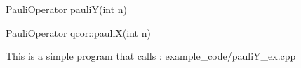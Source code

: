 
\begin{apidefinition}

\begin{Csynopsis}
    PauliOperator pauliY(int n)
\end{Csynopsis}

\begin{Cppsynopsis}
    PauliOperator qcor::pauliX(int n)
\end{Cppsynopsis}


\begin{apiarguments}
\end{apiarguments}



\apinotes{
    
}

\begin{apiexamples}

\apicppexample
    { This is a simple program that calls : } 
    { example_code/pauliY_ex.cpp} 
    {}

\end{apiexamples}

\end{apidefinition}
